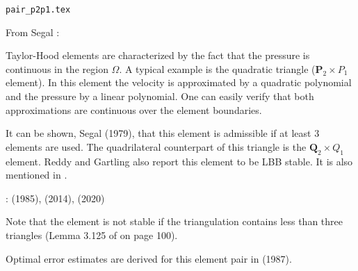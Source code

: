 \begin{flushright} {\tiny {\color{gray} \tt pair\_p2p1.tex}} \end{flushright}

\noindent
\begin{minipage}{0.54\textwidth}
From Segal \cite{segal}: 
\begin{displayquote}
{\color{darkgray}
Taylor-Hood elements \cite{taho73} 
are characterized by the fact that the pressure is continuous in the region $\Omega$. 
A typical example is the quadratic triangle (${\bm P}_2\times P_1$ element).
In this element the velocity is approximated by a quadratic polynomial and the pressure by a
linear polynomial. One can easily verify that both approximations are continuous over 
the element boundaries.}
\end{displayquote}

It can be shown, Segal (1979), that this element is admissible if at least 3 elements 
are used. The quadrilateral counterpart of this triangle is the ${\bm Q}_2\times Q_1$ element.
Reddy and Gartling \cite[p179]{reddybook2} also report this element to be LBB stable.
It is also mentioned in \textcite{nath93}.

\Literature: \textcite{scan85} (1985), \textcite{lejx14} (2014), \textcite{cump20} (2020)
\end{minipage}
\hfill
\begin{minipage}{0.42\textwidth}
\begin{center}

\end{center}
\end{minipage}

Note that the element is not stable if the triangulation contains less than three triangles
(Lemma 3.125 of \cite{john16} on page 100).

Optimal error estimates are derived for this element pair in \textcite{sten87} (1987). 

